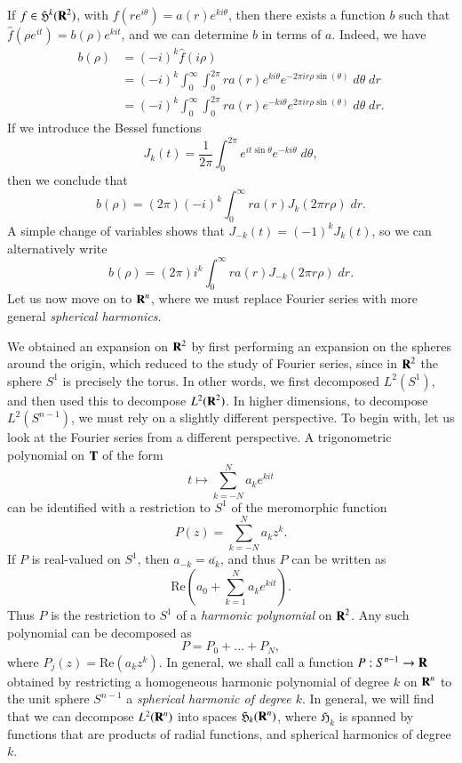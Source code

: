 If $f \in \mathfrak{H}^k(\operatorname{\mathbf{R}}^2)$, with $f(r e^{ i \theta}) = a(r) e^{k i \theta}$, then there exists a function $b$ such that $\widehat{f}(\rho e^{i t}) = b(\rho) e^{k i t}$, and we can determine $b$ in terms of $a$. Indeed, we have
%
\begin{align*} %
    b(\rho) &= (-i)^k \widehat{f}(i \rho)\\
    &= (-i)^k \int_0^\infty \int_0^{2\pi} r a(r) e^{ki \theta} e^{-2 \pi i r \rho \sin(\theta)}\; d\theta\; dr\\
    &= (-i)^k \int_0^\infty \int_0^{2\pi} r a(r) e^{-ki \theta} e^{2 \pi i r \rho \sin(\theta)}\; d\theta\; dr.
\end{align*}
%
If we introduce the Bessel functions
%
\[ J_k(t) = \frac{1}{2\pi} \int_0^{2\pi} e^{i t \sin \theta} e^{-ki \theta}\; d\theta, \]
%
then we conclude that
%
\[ b(\rho) = (2 \pi) (-i)^k \int_0^\infty r a(r) J_k(2 \pi r \rho)\; dr. \]
%
A simple change of variables shows that $J_{-k}(t) = (-1)^k J_k(t)$, so we can alternatively write
%
\[ b(\rho) = (2 \pi) i^k \int_0^\infty r a(r) J_{-k}(2 \pi r \rho)\; dr. \]
%
Let us now move on to $\operatorname{\mathbf{R}}^n$, where we must replace Fourier series with more general \emph{spherical harmonics}.

We obtained an expansion on $\operatorname{\mathbf{R}}^2$ by first performing an expansion on the spheres around the origin, which reduced to the study of Fourier series, since in $\operatorname{\mathbf{R}}^2$ the sphere $S^1$ is precisely the torus. In other words, we first decomposed $L^2(S^1)$, and then used this to decompose $L^2(\operatorname{\mathbf{R}}^2)$. In higher dimensions, to decompose $L^2(S^{n-1})$, we must rely on a slightly different perspective. To begin with, let us look at the Fourier series from a different perspective. A trigonometric polynomial on $\operatorname{\mathbf{T}}$ of the form
%
\[ t \mapsto \sum_{k = -N}^N a_k e^{kit} \]
%
can be identified with a restriction to $S^1$ of the meromorphic function
%
\[ P(z) = \sum_{k = -N}^N a_k z^k. \]
%
If $P$ is real-valued on $S^1$, then $a_{-k} = \overline{a_k}$, and thus $P$ can be written as
%
\[ \text{Re} \left( a_0 + \sum_{k = 1}^N a_k e^{kit} \right). \]
%
Thus $P$ is the restriction to $S^1$ of a \emph{harmonic polynomial} on $\operatorname{\mathbf{R}}^2$. Any such polynomial can be decomposed as
%
\[ P = P_0 + \dots + P_N, \]
%
where $P_j(z) = \text{Re}(a_k z^k)$. In general, we shall call a function $P: S^{n-1} \to \operatorname{\mathbf{R}}$ obtained by restricting a homogeneous harmonic polynomial of degree $k$ on $\operatorname{\mathbf{R}}^n$ to the unit sphere $S^{n-1}$ a \emph{spherical harmonic of degree $k$}. In general, we will find that we can decompose $L^2(\operatorname{\mathbf{R}}^n)$ into spaces $\mathfrak{H}_k(\operatorname{\mathbf{R}}^n)$, where $\mathfrak{H}_k$ is spanned by functions that are products of radial functions, and spherical harmonics of degree $k$.

